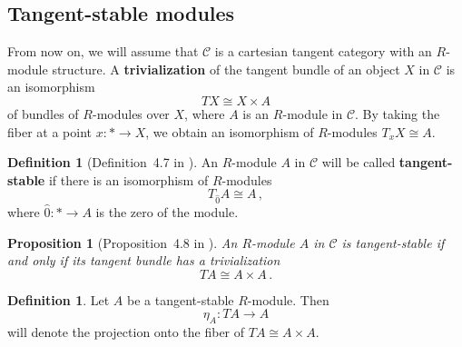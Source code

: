 \documentclass[12pt,reqno, a4paper]{amsart}
\numberwithin{equation}{section}
\theoremstyle{plain}
\newtheorem{Proposition}[Theorem]{Proposition}
\theoremstyle{definition}
\newtheorem{Definition}[Theorem]{Definition}
\theoremstyle{remark}
\newcommand{\calC}{\mathcal{C}}
\newcommand{\Val}{\eta}
\begin{document}
\subsection{Tangent-stable modules}

From now on, we will assume that $\calC$ is a cartesian tangent category with an $R$-module structure. A \textbf{trivialization} of the tangent bundle of an object $X$ in $\calC$ is an isomorphism
\begin{equation*}
  TX \cong X \times A
\end{equation*}
of bundles of $R$-modules over $X$, where $A$ is an $R$-module in $\calC$. By taking the fiber at a point $x: * \to X$, we obtain an isomorphism of $R$-modules $T_x X \cong A$.

\begin{Definition}[Definition~4.7 in \cite{AintablianBlohmann:2026}]
\label{def:ModTangentStable}
An $R$-module $A$ in $\calC$ will be called \textbf{tangent-stable} if there is an isomorphism of $R$-modules
\begin{equation*}
  T_{\hat{0}} A \cong A
  \,,
\end{equation*}
where $\hat{0}: * \to A$ is the zero of the module.
\end{Definition}

\begin{Proposition}[Proposition~4.8 in \cite{AintablianBlohmann:2026}]
An $R$-module $A$ in $\calC$ is tangent-stable if and only if its tangent bundle has a trivialization
\begin{equation*}
  TA \cong A \times A
  \,.
\end{equation*}
\end{Proposition}

\begin{Definition}
Let $A$ be a tangent-stable $R$-module. Then
\begin{equation*}
  \Val_A: TA \longrightarrow A
\end{equation*}
will denote the projection onto the fiber of $TA \cong A \times A$.
\end{Definition}
\end{document}
